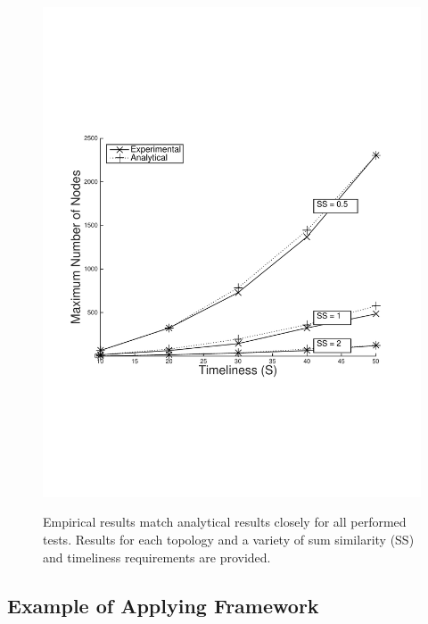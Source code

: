 \begin{figure}[]
{        \includegraphics[scale=0.29, clip=true, trim=15mm 65mm 20mm 65mm]{grid_uni_2d_mhop_2.pdf}
        \label{fig:scal_vs_qoi_grid}
        }

   \caption{Empirical results match analytical results closely for all performed tests.  Results for each topology and a variety of sum similarity (SS) and timeliness requirements are provided.}
   \label{fig:scal_vs_qoi}

\vspace{-6mm}
\end{figure}

\subsection{Example of Applying Framework}
\label{sec:example_apply_fw}

